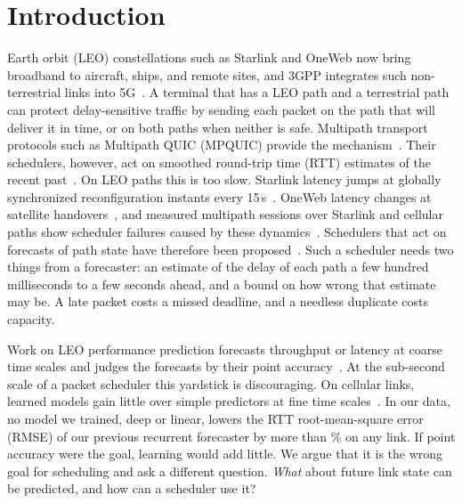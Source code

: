 \section{Introduction}
 Earth orbit (LEO) constellations such as Starlink and OneWeb now bring broadband to aircraft, ships, and remote sites, and 3GPP integrates such non-terrestrial links into 5G~\cite{lin20215g}. A terminal that has a LEO path and a terrestrial path can protect delay-sensitive traffic by sending each packet on the path that will deliver it in time, or on both paths when neither is safe. Multipath transport protocols such as Multipath QUIC (MPQUIC) provide the mechanism~\cite{deconinck2017multipath}. Their schedulers, however, act on smoothed round-trip time (RTT) estimates of the recent past~\cite{paasch2014experimental,lim2017ecf}. On LEO paths this is too slow. Starlink latency jumps at globally synchronized reconfiguration instants every 15\,s~\cite{mohan2024multifaceted,tanveer2023making}. OneWeb latency changes at satellite handovers~\cite{zhao2025measuring}, and measured multipath sessions over Starlink and cellular paths show scheduler failures caused by these dynamics~\cite{baltaci2023multipath}. Schedulers that act on forecasts of path state have therefore been proposed~\cite{yang2024mams,maglione2025intelligent}. Such a scheduler needs two things from a forecaster: an estimate of the delay of each path a few hundred milliseconds to a few seconds ahead, and a bound on how wrong that estimate may be. A late packet costs a missed deadline, and a needless duplicate costs capacity.

Work on LEO performance prediction forecasts throughput or latency at coarse time scales and judges the forecasts by their point accuracy~\cite{liu2025vivisecting,benghe2026horizon}. At the sub-second scale of a packet scheduler this yardstick is discouraging. On cellular links, learned models gain little over simple predictors at fine time scales~\cite{basit2024predictability}. In our data, no model we trained, deep or linear, lowers the RTT root-mean-square error (RMSE) of our previous recurrent forecaster by more than \MaxRMSEGain\% on any link. If point accuracy were the goal, learning would add little. We argue that it is the wrong goal for scheduling and ask a different question. \emph{What} about future link state can be predicted, and how can a scheduler use it?

